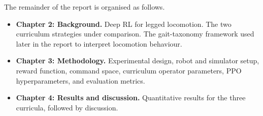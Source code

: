 The remainder of the report is organised as follows.
\begin{itemize}
  \item \textbf{Chapter 2: Background.} Deep RL for legged locomotion. The two curriculum strategies under comparison. The gait-taxonomy framework used later in the report to interpret locomotion behaviour.
  \item \textbf{Chapter 3: Methodology.} Experimental design, robot and simulator setup, reward function, command space, curriculum operator parameters, PPO hyperparameters, and evaluation metrics.
  \item \textbf{Chapter 4: Results and discussion.} Quantitative results for the three curricula, followed by discussion.
\end{itemize}
